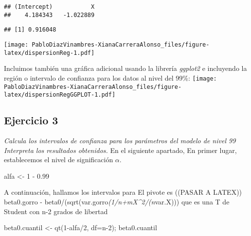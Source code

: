 \documentclass[
]{article}
\newenvironment{Shaded}{\begin{snugshade}}{\end{snugshade}}
\newcommand{\AttributeTok}[1]{\textcolor[rgb]{0.77,0.63,0.00}{#1}}
\newcommand{\CommentTok}[1]{\textcolor[rgb]{0.56,0.35,0.01}{\textit{#1}}}
\newcommand{\DecValTok}[1]{\textcolor[rgb]{0.00,0.00,0.81}{#1}}
\newcommand{\FloatTok}[1]{\textcolor[rgb]{0.00,0.00,0.81}{#1}}
\newcommand{\FunctionTok}[1]{\textcolor[rgb]{0.00,0.00,0.00}{#1}}
\newcommand{\NormalTok}[1]{#1}
\newcommand{\OtherTok}[1]{\textcolor[rgb]{0.56,0.35,0.01}{#1}}
\newcommand{\SpecialCharTok}[1]{\textcolor[rgb]{0.00,0.00,0.00}{#1}}
\begin{document}
\begin{verbatim}
## (Intercept)           X 
##    4.184343   -1.022889
\end{verbatim}

\begin{Shaded}
\end{Shaded}

\begin{verbatim}
## [1] 0.916048
\end{verbatim}

\texttt{[image: PabloDiazVinambres-XianaCarreraAlonso\_files/figure-latex/dispersionReg-1.pdf]}

Incluimos también una gráfica adicional usando la librería
\emph{ggplot2} e incluyendo la región o intervalo de confianza para los
datos al nivel del 99\%:
\texttt{[image: PabloDiazVinambres-XianaCarreraAlonso\_files/figure-latex/dispersionRegGGPLOT-1.pdf]}

\hypertarget{ejercicio-3}{%
\subsection{Ejercicio 3}\label{ejercicio-3}}

\textit{Calcula los intervalos de confianza para los parámetros del modelo de nivel 99%
Interpreta los resultados obtenidos.} En el siguiente apartado, En
primer lugar, establecemos el nivel de significación \(\alpha\).

\begin{Shaded}
\begin{Highlighting}[]
\NormalTok{alfa }\OtherTok{\textless{}{-}} \DecValTok{1} \SpecialCharTok{{-}} \FloatTok{0.99}
\end{Highlighting}
\end{Shaded}

A continuación, hallamos los intervalos para El pivote es ((PASAR A
LATEX)) beta0.gorro -
beta0/(sqrt(var.gorro\emph{(1/n+mX\^{}2/(n}var.X))) que es una T de
Student con n-2 grados de libertad

\begin{Shaded}
\begin{Highlighting}[]
\NormalTok{beta0.cuantil }\OtherTok{\textless{}{-}} \FunctionTok{qt}\NormalTok{(}\DecValTok{1}\SpecialCharTok{{-}}\NormalTok{alfa}\SpecialCharTok{/}\DecValTok{2}\NormalTok{, }\AttributeTok{df=}\NormalTok{n}\DecValTok{{-}2}\NormalTok{); beta0.cuantil}
\end{Highlighting}
\end{Shaded}
\end{document}
